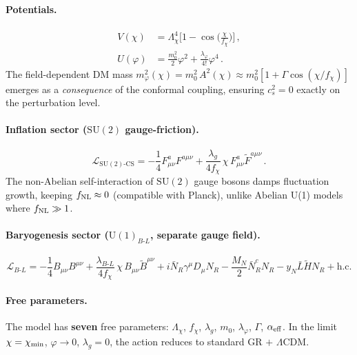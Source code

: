 \documentclass[a4paper,11pt]{article}
\newcommand{\LCDM}{$\Lambda$CDM}
\newcommand{\chif}{\chi}
\newcommand{\phif}{\varphi}
\newcommand{\fchi}{f_\chi}
\newcommand{\Lchi}{\Lambda_\chi}
\newcommand{\lag}{\lambda_g}
\newcommand{\UBL}{\mathrm{U}(1)_{B\text{-}L}}
\newcommand{\SUt}{\mathrm{SU}(2)}
\begin{document}
\paragraph{Potentials.}
\begin{align}
V(\chif) &= \Lchi^4 \bigg[1 - \cos\!\bigg(\frac{\chif}{\fchi}\bigg)\bigg]\,,\\
U(\phif) &= \frac{m_0^2}{2}\phif^2 + \frac{\lambda_\phif}{4!}\phif^4\,.
\end{align}
The field-dependent DM mass $m_\phif^2(\chif) = m_0^2\, A^2(\chif) \approx m_0^2[1 + \Gamma\cos(\chif/\fchi)]$ emerges as a \textit{consequence} of the conformal coupling, ensuring $c_s^2 = 0$ exactly on the perturbation level.

\paragraph{Inflation sector ($\SUt$ gauge-friction).}
\begin{equation}
\mathcal{L}_{\SUt\text{-CS}} = -\frac{1}{4}F^a_{\mu\nu}F^{a\mu\nu} + \frac{\lag}{4\fchi}\,\chif\, F^a_{\mu\nu}\tilde{F}^{a\mu\nu}\,.
\end{equation}
The non-Abelian self-interaction of $\SUt$ gauge bosons damps fluctuation growth, keeping $f_{\rm NL} \approx 0$ (compatible with Planck), unlike Abelian U(1) models where $f_{\rm NL} \gg 1$.

\paragraph{Baryogenesis sector ($\UBL$, separate gauge field).}
\begin{equation}
\mathcal{L}_{B\text{-}L} = -\frac{1}{4}B_{\mu\nu}B^{\mu\nu} + \frac{\lambda_{B\text{-}L}}{4\fchi}\,\chif\, B_{\mu\nu}\tilde{B}^{\mu\nu} + i\bar{N}_R\gamma^\mu D_\mu N_R - \frac{M_N}{2}\bar{N}_R^c N_R - y_N \bar{L}\tilde{H}N_R + \text{h.c.}
\end{equation}

\paragraph{Free parameters.} The model has \textbf{seven} free parameters: $\Lchi$, $\fchi$, $\lag$, $m_0$, $\lambda_\phif$, $\Gamma$, $\alpha_{\rm eff}$. In the limit $\chif = \chif_{\rm min}$, $\phif \to 0$, $\lag = 0$, the action reduces to standard GR $+$ \LCDM.


\end{document}

